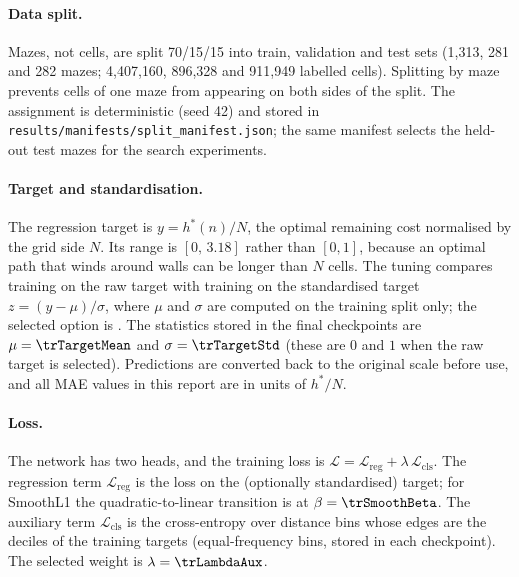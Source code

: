 \documentclass[11pt]{article}
\begin{document}
\paragraph{Data split.}
Mazes, not cells, are split 70/15/15 into train, validation and test sets (1{,}313, 281 and
282 mazes; 4{,}407{,}160, 896{,}328 and 911{,}949 labelled cells). Splitting by maze
prevents cells of one maze from appearing on both sides of the split. The assignment is
deterministic (seed 42) and stored in \texttt{results/manifests/split\_manifest.json}; the
same manifest selects the held-out test mazes for the search experiments.

\paragraph{Target and standardisation.}
The regression target is $y=h^*(n)/N$, the optimal remaining cost normalised by the grid
side $N$. Its range is $[0,\,3.18]$ rather than $[0,1]$, because an optimal path that winds
around walls can be longer than $N$ cells. The tuning compares training on the raw target
with training on the standardised target $z=(y-\mu)/\sigma$, where $\mu$ and $\sigma$ are
computed on the training split only; the selected option is \texttt{\trTargetTransform}.
The statistics stored in the final checkpoints are $\mu=\trTargetMean$ and
$\sigma=\trTargetStd$ (these are $0$ and $1$ when the raw target is selected). Predictions
are converted back to the original scale before use, and all MAE values in this report are
in units of $h^*/N$.

\paragraph{Loss.}
The network has two heads, and the training loss is
$\mathcal{L}=\mathcal{L}_{\mathrm{reg}}+\lambda\,\mathcal{L}_{\mathrm{cls}}$.
The regression term $\mathcal{L}_{\mathrm{reg}}$ is the \texttt{\trRegLoss} loss on the
(optionally standardised) target; for SmoothL1 the quadratic-to-linear transition is at
$\beta=\trSmoothBeta$. The auxiliary term $\mathcal{L}_{\mathrm{cls}}$ is the cross-entropy
over \trNumBins{} distance bins whose edges are the deciles of the training targets
(equal-frequency bins, stored in each checkpoint). The selected weight is
$\lambda=\trLambdaAux$.
\end{document}
